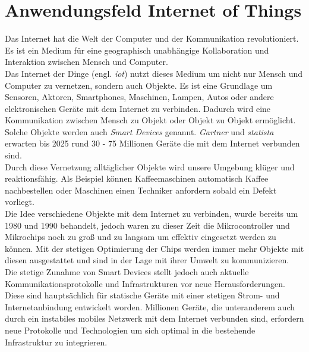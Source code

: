 \section{Anwendungsfeld Internet of Things} \label{s:domain}
Das Internet hat die Welt der Computer und der Kommunikation revolutioniert. Es ist ein Medium für eine geographisch unabhängige Kollaboration und Interaktion zwischen Mensch und Computer.
\cite{BriefHistoryInternet}
\\
Das Internet der Dinge (engl. \textit{\ac{iot}}) nutzt dieses Medium um nicht nur Mensch und Computer zu vernetzen, sondern auch Objekte. Es ist eine Grundlage um Sensoren, Aktoren, Smartphones, Maschinen, Lampen, Autos oder andere elektronischen Geräte mit dem Internet zu verbinden.
\cite{morganSimpleExplanationInternet}
Dadurch wird eine Kommunikation zwischen Mensch zu Objekt oder Objekt zu Objekt ermöglicht.
\cite{uckelmannArchitectingInternetThings2011}
Solche Objekte werden auch \textit{Smart Devices} genannt.
\textit{Gartner} \cite{hungGartnerInsightsHow} und \textit{statista} \cite{GlobalIoTNonIoT} erwarten bis 2025 rund 30 - 75 Millionen Geräte die mit dem Internet verbunden sind.
\\
Durch diese Vernetzung alltäglicher Objekte wird unsere Umgebung klüger und reaktionsfähig. Als Beispiel können Kaffeemaschinen automatisch Kaffee nachbestellen oder Maschinen einen Techniker anfordern sobald ein Defekt vorliegt.
\cite{rangerWhatIoTEverything}
\\
Die Idee verschiedene Objekte mit dem Internet zu verbinden, wurde bereits um 1980 und 1990 behandelt, jedoch waren zu dieser Zeit die Mikrocontroller und Mikrochips noch zu gro{\ss} und zu langsam um effektiv eingesetzt werden zu können.
Mit der stetigen Optimierung der Chips werden immer mehr Objekte mit diesen ausgestattet und sind in der Lage mit ihrer Umwelt zu kommunizieren.
\cite{rangerWhatIoTEverything}
\\
Die stetige Zunahme von Smart Devices stellt jedoch auch aktuelle Kommunikationsprotokolle und Infrastrukturen vor neue Herausforderungen.
Diese sind hauptsächlich für statische Geräte mit einer stetigen Strom- und Internetanbindung entwickelt worden. Millionen Geräte, die unteranderem auch durch ein instabiles mobiles Netzwerk mit dem Internet verbunden sind, erfordern neue Protokolle und Technologien um sich optimal in die bestehende Infrastruktur zu integrieren.
\cite{uckelmannArchitectingInternetThings2011}
\newpage

